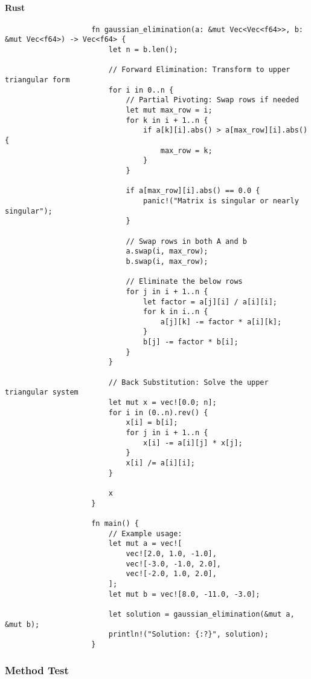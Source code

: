 \documentclass{article}
\begin{document}
            \paragraph{Rust}
                \begin{verbatim}
                    fn gaussian_elimination(a: &mut Vec<Vec<f64>>, b: &mut Vec<f64>) -> Vec<f64> {
                        let n = b.len();

                        // Forward Elimination: Transform to upper triangular form
                        for i in 0..n {
                            // Partial Pivoting: Swap rows if needed
                            let mut max_row = i;
                            for k in i + 1..n {
                                if a[k][i].abs() > a[max_row][i].abs() {
                                    max_row = k;
                                }
                            }

                            if a[max_row][i].abs() == 0.0 {
                                panic!("Matrix is singular or nearly singular");
                            }

                            // Swap rows in both A and b
                            a.swap(i, max_row);
                            b.swap(i, max_row);

                            // Eliminate the below rows
                            for j in i + 1..n {
                                let factor = a[j][i] / a[i][i];
                                for k in i..n {
                                    a[j][k] -= factor * a[i][k];
                                }
                                b[j] -= factor * b[i];
                            }
                        }

                        // Back Substitution: Solve the upper triangular system
                        let mut x = vec![0.0; n];
                        for i in (0..n).rev() {
                            x[i] = b[i];
                            for j in i + 1..n {
                                x[i] -= a[i][j] * x[j];
                            }
                            x[i] /= a[i][i];
                        }

                        x
                    }

                    fn main() {
                        // Example usage:
                        let mut a = vec![
                            vec![2.0, 1.0, -1.0],
                            vec![-3.0, -1.0, 2.0],
                            vec![-2.0, 1.0, 2.0],
                        ];
                        let mut b = vec![8.0, -11.0, -3.0];

                        let solution = gaussian_elimination(&mut a, &mut b);
                        println!("Solution: {:?}", solution);
                    }

                \end{verbatim}
        \subsubsection{Method Test}
\end{document}
